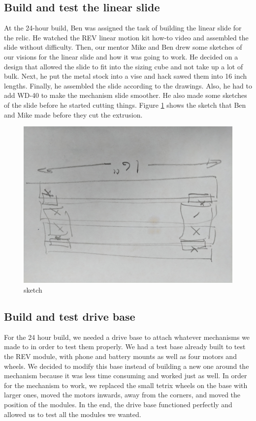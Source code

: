 \documentclass{article}
\begin{document}
\subsection{Build and test the linear slide}
At the 24-hour build,  Ben was assigned the task of building the linear slide for the relic. He watched the REV linear motion kit how-to video and assembled the slide without difficulty. Then, our mentor Mike and Ben drew some sketches of our visions for the linear slide and how it was going to work. He decided on a design that allowed the slide to fit into the sizing cube and not take up a lot of bulk. Next, he put the metal stock into a vise and hack sawed them into 16 inch lengths. Finally, he assembled the slide according to the drawings. Also, he had to add WD-40 to make the mechanism slide smoother. He also made some sketches of the slide before he started cutting things. Figure \ref{fig:sketch} shows the sketch that Ben and Mike made before they cut the extrusion.
\begin{figure}[h]
    \centering
    \includegraphics[width=.6\textwidth]{01/images/Sketch2.jpg}
    \caption{sketch}
    \label{fig:sketch}
\end{figure}

\subsection{Build and test drive base}
For the 24 hour build, we needed a drive base to attach whatever mechanisms we made to in order to test them properly. We had a test base already built to test the REV module, with phone and battery mounts as well as four motors and wheels. We decided to modify this base instead of building a new one around the mechanism because it was less time consuming and worked just as well. In order for the mechanism to work, we replaced the small tetrix wheels on the base with larger ones, moved the motors inwards, away from the corners, and moved the position of the modules. In the end, the drive base functioned perfectly and allowed us to test all the modules we wanted.
\end{document}
